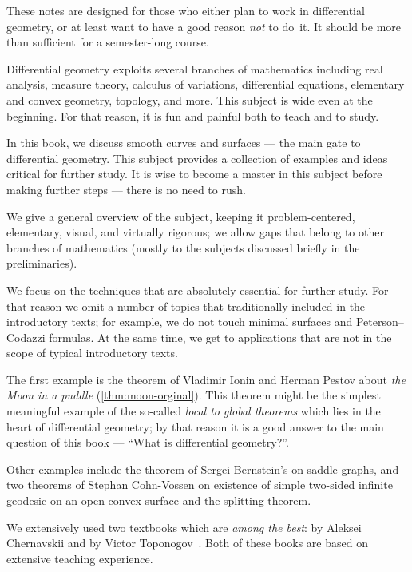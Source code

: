 \vfill

\newpage

\thispagestyle{myheadings}

These notes are designed for those who either plan to work in differential geometry,
or at least want to have a good reason {}\emph{not} to do~it.
It should be more than sufficient for a semester-long course. 

Differential geometry exploits several branches of mathematics including 
real analysis, 
measure theory,
calculus of variations,
differential equations,
elementary and convex geometry,
topology, and more.
This subject is wide even at the beginning. 
For that reason, it is fun and painful both to teach and to study.

In this book, we discuss smooth curves and surfaces --- the main gate to differential geometry.
This subject provides a collection of examples and ideas critical for further study.
It is wise to become a master in this subject before making further steps --- there is no need to rush.

We give a general overview of the subject, keeping it
problem-centered,
elementary, 
visual, 
and virtually rigorous; we allow gaps that belong to other branches of mathematics (mostly to the subjects discussed briefly in the preliminaries).

We focus on the techniques that are absolutely essential for further study.
For  that reason we omit a number of topics that traditionally included in the introductory texts;
for example, we do not touch %
minimal surfaces and Peterson--Codazzi formulas.
At the same time, we get to applications
 that are not in the scope of typical introductory texts.
 
The first example is the theorem of Vladimir Ionin and Herman Pestov about {}\emph{the Moon in a puddle} (\ref{thm:moon-orginal}).
This theorem might be the simplest meaningful example of the so-called {}\emph{local to global theorems} which lies in the heart of differential geometry;
by that reason it is a good answer to the main question of this book --- ``What is differential geometry?''.

Other examples include the theorem of Sergei Bernstein's on saddle graphs, and two theorems of Stephan Cohn-Vossen on existence of simple two-sided infinite geodesic on an open convex surface and the splitting theorem.

We extensively used two textbooks which are {}\emph{among the best}: by Aleksei Chernavskii \cite{chernavsky} and by Victor Toponogov~\cite{toponogov-book}.
Both of these books are based on extensive teaching experience.

